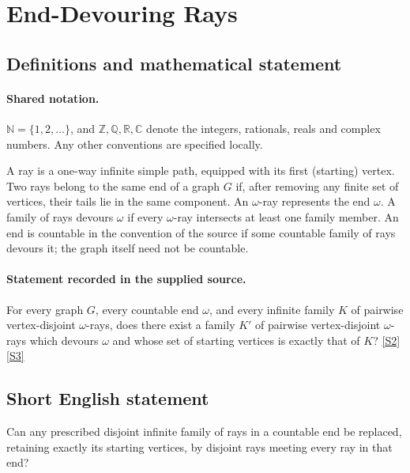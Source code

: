 \documentclass[11pt]{article}
\newcommand{\sref}[2]{\hyperlink{source:#1:#2}{[S#2]}}
\begin{document}
\section{End-Devouring Rays}\label{statement}

\subsection{Definitions and mathematical statement}

\paragraph{Shared notation.}$\mathbb N=\{1,2,\ldots\}$, and $\mathbb Z,\mathbb Q,\mathbb R,\mathbb C$ denote the integers, rationals, reals and complex numbers. Any other conventions are specified locally.


A ray is a one-way infinite simple path, equipped with its first (starting) vertex. Two rays belong to the same end of a graph $G$ if, after removing any finite set of vertices, their tails lie in the same component. An $\omega$-ray represents the end $\omega$. A family of rays devours $\omega$ if every $\omega$-ray intersects at least one family member. An end is countable in the convention of the source if some countable family of rays devours it; the graph itself need not be countable.
\paragraph{Statement recorded in the supplied source.}
For every graph $G$, every countable end $\omega$, and every infinite family $K$ of pairwise vertex-disjoint $\omega$-rays, does there exist a family $K'$ of pairwise vertex-disjoint $\omega$-rays which devours $\omega$ and whose set of starting vertices is exactly that of $K$? \sref{statement}{2} \sref{statement}{3}
\subsection{Short English statement}
Can any prescribed disjoint infinite family of rays in a countable end be replaced, retaining exactly its starting vertices, by disjoint rays meeting every ray in that end?
\end{document}
